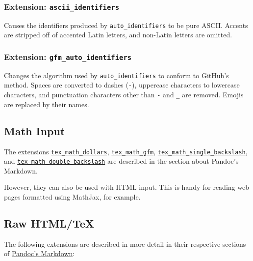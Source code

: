 \documentclass[
]{article}
\begin{document}
\hypertarget{extension-ascii_identifiers}{%
\subsubsection{\texorpdfstring{Extension:
\texttt{ascii\_identifiers}}{Extension: ascii\_identifiers}}\label{extension-ascii_identifiers}}

Causes the identifiers produced by \texttt{auto\_identifiers} to be pure
ASCII. Accents are stripped off of accented Latin letters, and non-Latin
letters are omitted.

\hypertarget{extension-gfm_auto_identifiers}{%
\subsubsection{\texorpdfstring{Extension:
\texttt{gfm\_auto\_identifiers}}{Extension: gfm\_auto\_identifiers}}\label{extension-gfm_auto_identifiers}}

Changes the algorithm used by \texttt{auto\_identifiers} to conform to
GitHub's method. Spaces are converted to dashes (\texttt{-}), uppercase
characters to lowercase characters, and punctuation characters other
than \texttt{-} and \texttt{\_} are removed. Emojis are replaced by
their names.

\hypertarget{math-input}{%
\subsection{Math Input}\label{math-input}}

The extensions
\protect\hyperlink{extension-tex_math_dollars}{\texttt{tex\_math\_dollars}},
\protect\hyperlink{extension-tex_math_gfm}{\texttt{tex\_math\_gfm}},
\protect\hyperlink{extension-tex_math_single_backslash}{\texttt{tex\_math\_single\_backslash}},
and
\protect\hyperlink{extension-tex_math_double_backslash}{\texttt{tex\_math\_double\_backslash}}
are described in the section about Pandoc's Markdown.

However, they can also be used with HTML input. This is handy for
reading web pages formatted using MathJax, for example.

\hypertarget{raw-htmltex}{%
\subsection{Raw HTML/TeX}\label{raw-htmltex}}

The following extensions are described in more detail in their
respective sections of \protect\hyperlink{pandocs-markdown}{Pandoc's
Markdown}:
\end{document}
